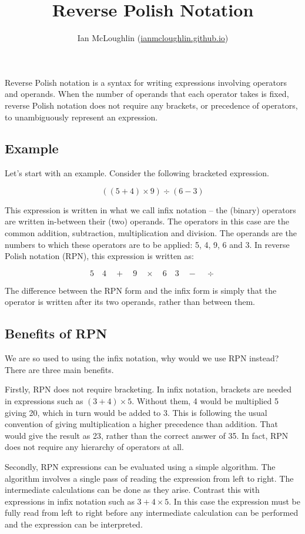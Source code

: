 \documentclass[a4paper]{iagproc}
\title{Reverse Polish Notation}
\author{Ian McLoughlin (\href{https://ianmcloughlin.github.io}{ianmcloughlin.github.io})}
\begin{document}
\maketitle
\noindent
Reverse Polish notation is a syntax for writing expressions involving operators and operands.
When the number of operands that each operator takes is fixed, reverse Polish notation does not require any brackets, or precedence of operators, to unambiguously represent an expression.

\subsection*{Example}
Let’s start with an example.
Consider the following bracketed expression.

$$ ((5 + 4) \times 9) \div (6 - 3) $$

This expression is written in what we call infix notation -- the (binary) operators are written in-between their (two) operands.
The operators in this case are the common addition, subtraction, multiplication and division.
The operands are the numbers to which these operators are to be applied: 5, 4, 9, 6 and 3.
In reverse Polish notation (RPN), this expression is written as:

$$ 5 \quad 4 \quad + \quad 9 \quad \times \quad  6 \quad 3 \quad - \quad \div $$

The difference between the RPN form and the infix form is simply that the operator is written after its two operands, rather than between them.

\subsection*{Benefits of RPN}
We are so used to using the infix notation, why would we use RPN instead?
There are three main benefits.

Firstly, RPN does not require bracketing.
In infix notation, brackets are needed in expressions such as $(3 + 4) \times 5$.
Without them, 4 would be multiplied 5 giving 20, which in turn would be added to 3.
This is following the usual convention of giving multiplication a higher precedence than addition.
That would give the result as 23, rather than the correct answer of 35.
In fact, RPN does not require any hierarchy of operators at all.

Secondly, RPN expressions can be evaluated using a simple algorithm.
The algorithm involves a single pass of reading the expression from left to right.
The intermediate calculations can be done as they arise.
Contrast this with expressions in infix notation such as $3 + 4 \times 5$.
In this case the expression must be fully read from left to right before any intermediate calculation can be performed and the expression can be interpreted.
\end{document}

